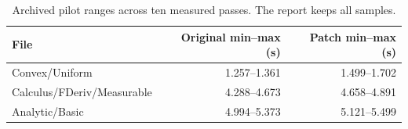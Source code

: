 \begin{table}[h]
\centering\small
\caption{Archived pilot ranges across ten measured passes. The report keeps all samples.}
\begin{tabular}{lrr}\toprule
File & Original min--max (s) & Patch min--max (s)\\\midrule
Convex/Uniform & 1.257--1.361 & 1.499--1.702\\
Calculus/FDeriv/Measurable & 4.288--4.673 & 4.658--4.891\\
Analytic/Basic & 4.994--5.373 & 5.121--5.499\\\bottomrule\end{tabular}\end{table}
